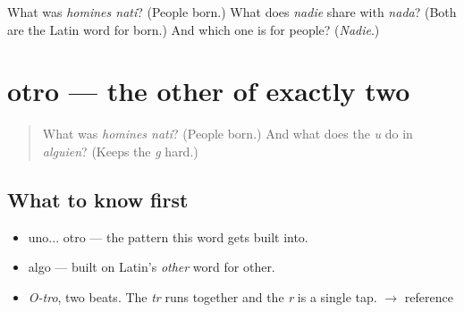 \begin{tcolorbox}[breakable,colback=teal!4,colframe=teal!35!black,title={Before you move on}]
What was \emph{homines nati}? (People born.) What does \emph{nadie} share with \emph{nada}? (Both are the Latin word for born.) And which one is for people? (\emph{Nadie}.)
\end{tcolorbox}
\section[otro]{otro — the other of exactly two}

\label{lesson:ES-C317-otro}



\begin{quote}
What was \emph{homines nati}? (People born.) And what does the \emph{u} do in \emph{alguien}? (Keeps the \emph{g} hard.)
\end{quote}

\subsection*{What to know first}
\begin{itemize}
\raggedright
  \item uno... otro — the pattern this word gets built into.
  \item algo — built on Latin's \emph{other} word for other.
\end{itemize}

\begin{sounds}
\begin{itemize}
\raggedright
  \item \emph{O-tro}, two beats. The \emph{tr} runs together and the \emph{r} is a single tap. $\to$ reference
\end{itemize}
\end{sounds}

